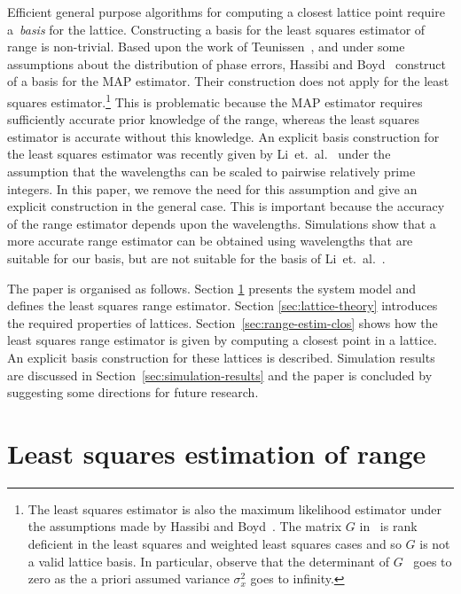 \documentclass[10pt,twocolumn,twoside]{IEEEtran}
\begin{document}
Efficient general purpose algorithms for computing a closest lattice point require a~\emph{basis} for the lattice.  Constructing a basis for the least squares estimator of range is non-trivial.  Based upon the work of Teunissen~\cite{Teunissen_GPS_1995}, and under some assumptions about the distribution of phase errors, Hassibi and Boyd~\cite{Hassibi_GPS_1998} construct of a basis for the MAP estimator.  Their construction does not apply for the least squares estimator.\footnote{The least squares estimator is also the maximum likelihood estimator under the assumptions made by Hassibi and Boyd~\cite{Hassibi_GPS_1998}.  The matrix $G$ in~\cite{Hassibi_GPS_1998} is rank deficient in the least squares and weighted least squares cases and so $G$ is not a valid lattice basis.  In particular, observe that the determinant of $G$~\cite[p.~2948]{Hassibi_GPS_1998} goes to zero as the a priori assumed variance $\sigma_x^2$ goes to infinity.}  This is problematic because the MAP estimator requires sufficiently accurate prior knowledge of the range, whereas the least squares estimator is accurate without this knowledge.  An explicit basis construction for the least squares estimator was recently given by Li~et.~al.~\cite{Li_distance_est_wrapped_phase} under the assumption that the wavelengths can be scaled to pairwise relatively prime integers.  In this paper, we remove the need for this assumption and give an explicit construction in the general case.  This is important because the accuracy of the range estimator depends upon the wavelengths.  Simulations show that a more accurate range estimator can be obtained using wavelengths that are suitable for our basis, but are not suitable for the basis of Li~et.~al.~\cite{Li_distance_est_wrapped_phase}.  %

The paper is organised as follows.  Section \ref{sec:ls-estimator} presents the system model and defines the least squares range estimator. Section \ref{sec:lattice-theory} introduces the required properties of lattices.  Section~\ref{sec:range-estim-clos} shows how the least squares range estimator is given by computing a closest point in a lattice.  An explicit basis construction for these lattices is described. Simulation results are discussed in Section~\ref{sec:simulation-results} and the paper is concluded by suggesting some directions for future research.

\section{Least squares estimation of range}\label{sec:ls-estimator}
\end{document}

